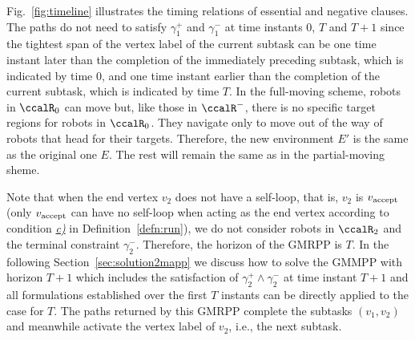 \documentclass[Afour,sageh,times]{sagej}
\newcommand{\vertex}[1]{v_{\textup{#1}}}
\begin{document}
 Fig.~\ref{fig:timeline} illustrates the timing relations of essential and negative clauses.  The paths do not need to satisfy  $\gamma_1^+$ and $\gamma_1^-$ at time instants 0,  $T$ and $ T+1$ since the tightest span of the vertex label of the current subtask can be one time instant later than the completion of the immediately preceding subtask, which is indicated by time 0, and one time instant earlier than the completion of the current subtask, which is indicated by time $T$. In the full-moving scheme, robots in $\ccalR_0$ can move but, like those in $\ccalR^-$, there is no specific target regions for robots in $\ccalR_0$. They  navigate only to move out of the way of robots that head for their targets. Therefore, the new environment $E'$ is the same as the original one $E$. The rest will remain the same as in the partial-moving sheme.

 Note that when the end vertex $v_2$ does not have a self-loop, that is, $v_2$ is $\vertex{accept}$ (only $\vertex{accept}$ can have no self-loop when acting as the end vertex according to condition \hyperref[cond:c]{\it c)} in Definition~\ref{defn:run}), we do not consider robots in $\ccalR_2$ and the terminal constraint $\gamma_2^-$. Therefore, the horizon of the GMRPP is $T$. In the following Section~\ref{sec:solution2mapp} we discuss how to solve the GMMPP with horizon $T+1$ which  includes the satisfaction of $\gamma_2^+\wedge \gamma_2^-$ at time instant $T+1$ and all formulations established over the first $T$ instants can be directly applied to the case for $T$.  The paths returned by this GMRPP complete the subtasks $(v_1, v_2)$  and meanwhile activate the vertex label of $v_2$, i.e., the next subtask.
\end{document}
